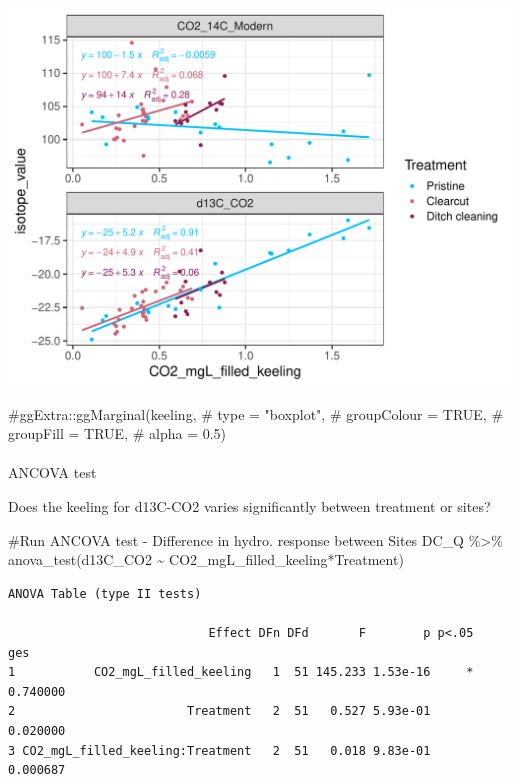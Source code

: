 \documentclass[
  letterpaper,
  DIV=11,
  numbers=noendperiod]{scrartcl}
\makeatletter
\let\oldparagraph\paragraph
\renewcommand{\paragraph}{
    \@ifstar
      \xxxParagraphStar
      \xxxParagraphNoStar
  }
\newcommand{\xxxParagraphStar}[1]{\oldparagraph*{#1}\mbox{}}
\newcommand{\xxxParagraphNoStar}[1]{\oldparagraph{#1}\mbox{}}
\newenvironment{Shaded}{\begin{snugshade}}{\end{snugshade}}
\newcommand{\CommentTok}[1]{\textcolor[rgb]{0.37,0.37,0.37}{#1}}
\newcommand{\FunctionTok}[1]{\textcolor[rgb]{0.28,0.35,0.67}{#1}}
\newcommand{\NormalTok}[1]{\textcolor[rgb]{0.00,0.23,0.31}{#1}}
\newcommand{\SpecialCharTok}[1]{\textcolor[rgb]{0.37,0.37,0.37}{#1}}
\makeatother
\begin{document}
\includegraphics{index_files/figure-pdf/unnamed-chunk-14-1.pdf}

\begin{Shaded}
\begin{Highlighting}[]
\CommentTok{\#ggExtra::ggMarginal(keeling, }
\CommentTok{\#                    type = "boxplot", }
\CommentTok{\#                    groupColour = TRUE, }
\CommentTok{\#                    groupFill = TRUE,}
\CommentTok{\#                    alpha = 0.5)}
\end{Highlighting}
\end{Shaded}

\paragraph{ANCOVA test}\label{ancova-test-2}

Does the keeling for d13C-CO2 varies significantly between treatment or
sites?

\begin{Shaded}
\begin{Highlighting}[]
\CommentTok{\#Run ANCOVA test {-} Difference in hydro. response between Sites}
\NormalTok{DC\_Q }\SpecialCharTok{\%\textgreater{}\%} \FunctionTok{anova\_test}\NormalTok{(d13C\_CO2 }\SpecialCharTok{\textasciitilde{}}\NormalTok{ CO2\_mgL\_filled\_keeling}\SpecialCharTok{*}\NormalTok{Treatment)}
\end{Highlighting}
\end{Shaded}

\begin{verbatim}
ANOVA Table (type II tests)

                            Effect DFn DFd       F        p p<.05      ges
1           CO2_mgL_filled_keeling   1  51 145.233 1.53e-16     * 0.740000
2                        Treatment   2  51   0.527 5.93e-01       0.020000
3 CO2_mgL_filled_keeling:Treatment   2  51   0.018 9.83e-01       0.000687
\end{verbatim}
\end{document}
